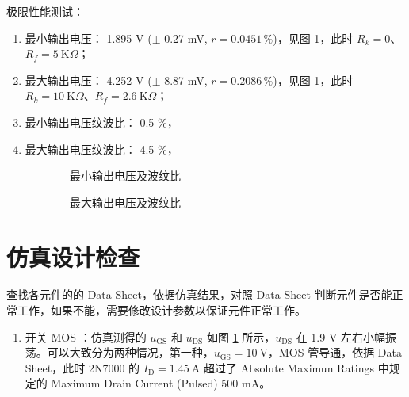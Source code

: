 \documentclass[UTF8]{report}
\def\KO{\ \mathrm{K}\Omega}
\theoremstyle{MyLineTheoremStyle} %
\theoremstyle{MyBlockTheoremStyle} %
\theoremstyle{MySubsubsectionStyle} %
\begin{document}
\noindent 极限性能测试：
\begin{enumerate}
\item 最小输出电压： 1.895 V ($\pm$ 0.27 mV, $r = 0.0451 \,\%$)，见图 \ref{}，此时 $R_k = 0$、$R_f =  5\KO$；
\item 最大输出电压： 4.252 V ($\pm$ 8.87 mV, $r = 0.2086 \,\%$)，见图 \ref{}，此时 $R_k = 10 \KO$、$R_f =  2.6\KO$；
\item 最小输出电压纹波比： 0.5 \%，
\item 最大输出电压纹波比： 4.5 \%，
\end{enumerate}

\begin{figure}[H]\centering
\begin{subfigure}[b]{0.5\columnwidth}\centering
    \caption{最小输出电压及波纹比}
\end{subfigure}\hfill
\begin{subfigure}[b]{0.5\columnwidth}\centering
    \caption{最大输出电压及波纹比}
\end{subfigure}
\caption{}
\end{figure}

\section{仿真设计检查}
查找各元件的的 Data Sheet，依据仿真结果，对照 Data Sheet 判断元件是否能正常工作，如果不能，需要修改设计参数以保证元件正常工作。

\begin{enumerate}
\item 开关 MOS ：仿真测得的 $u_\text{GS}$ 和 $u_{\text{DS}}$ 如图 \ref{} 所示，$u_{\text{DS}}$ 在 1.9 V 左右小幅振荡。可以大致分为两种情况，第一种，$u_{\text{GS}} = 10 \ \mathrm{V}$，MOS 管导通，依据 Data Sheet，此时 2N7000 的 $I_{\text{D}} = 1.45 \ \mathrm{A}$ 超过了 Absolute Maximun Ratings 中规定的 Maximum Drain Current (Pulsed) 500 mA。
\end{enumerate}
\end{document}
